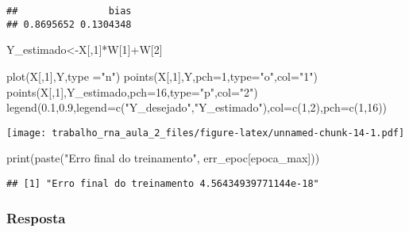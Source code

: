 \documentclass[
]{article}
\newenvironment{Shaded}{\begin{snugshade}}{\end{snugshade}}
\newcommand{\AttributeTok}[1]{\textcolor[rgb]{0.77,0.63,0.00}{#1}}
\newcommand{\DecValTok}[1]{\textcolor[rgb]{0.00,0.00,0.81}{#1}}
\newcommand{\FloatTok}[1]{\textcolor[rgb]{0.00,0.00,0.81}{#1}}
\newcommand{\FunctionTok}[1]{\textcolor[rgb]{0.00,0.00,0.00}{#1}}
\newcommand{\NormalTok}[1]{#1}
\newcommand{\OtherTok}[1]{\textcolor[rgb]{0.56,0.35,0.01}{#1}}
\newcommand{\SpecialCharTok}[1]{\textcolor[rgb]{0.00,0.00,0.00}{#1}}
\newcommand{\StringTok}[1]{\textcolor[rgb]{0.31,0.60,0.02}{#1}}
\begin{document}
\begin{verbatim}
##                bias 
## 0.8695652 0.1304348
\end{verbatim}

\begin{Shaded}
\begin{Highlighting}[]
\NormalTok{Y\_estimado}\OtherTok{\textless{}{-}}\NormalTok{X[,}\DecValTok{1}\NormalTok{]}\SpecialCharTok{*}\NormalTok{W[}\DecValTok{1}\NormalTok{]}\SpecialCharTok{+}\NormalTok{W[}\DecValTok{2}\NormalTok{]}

\FunctionTok{plot}\NormalTok{(X[,}\DecValTok{1}\NormalTok{],Y,}\AttributeTok{type =}\StringTok{"n"}\NormalTok{)}
\FunctionTok{points}\NormalTok{(X[,}\DecValTok{1}\NormalTok{],Y,}\AttributeTok{pch=}\DecValTok{1}\NormalTok{,}\AttributeTok{type=}\StringTok{"o"}\NormalTok{,}\AttributeTok{col=}\StringTok{"1"}\NormalTok{)}
\FunctionTok{points}\NormalTok{(X[,}\DecValTok{1}\NormalTok{],Y\_estimado,}\AttributeTok{pch=}\DecValTok{16}\NormalTok{,}\AttributeTok{type=}\StringTok{"p"}\NormalTok{,}\AttributeTok{col=}\StringTok{"2"}\NormalTok{)}
\FunctionTok{legend}\NormalTok{(}\FloatTok{0.1}\NormalTok{,}\FloatTok{0.9}\NormalTok{,}\AttributeTok{legend=}\FunctionTok{c}\NormalTok{(}\StringTok{"Y\_desejado"}\NormalTok{,}\StringTok{"Y\_estimado"}\NormalTok{),}\AttributeTok{col=}\FunctionTok{c}\NormalTok{(}\DecValTok{1}\NormalTok{,}\DecValTok{2}\NormalTok{),}\AttributeTok{pch=}\FunctionTok{c}\NormalTok{(}\DecValTok{1}\NormalTok{,}\DecValTok{16}\NormalTok{))}
\end{Highlighting}
\end{Shaded}

\texttt{[image: trabalho\_rna\_aula\_2\_files/figure-latex/unnamed-chunk-14-1.pdf]}

\begin{Shaded}
\begin{Highlighting}[]
\FunctionTok{print}\NormalTok{(}\FunctionTok{paste}\NormalTok{(}\StringTok{"Erro final do treinamento"}\NormalTok{, err\_epoc[epoca\_max]))}
\end{Highlighting}
\end{Shaded}

\begin{verbatim}
## [1] "Erro final do treinamento 4.56434939771144e-18"
\end{verbatim}

\hypertarget{resposta-2}{%
\subsubsection{Resposta}\label{resposta-2}}
\end{document}
